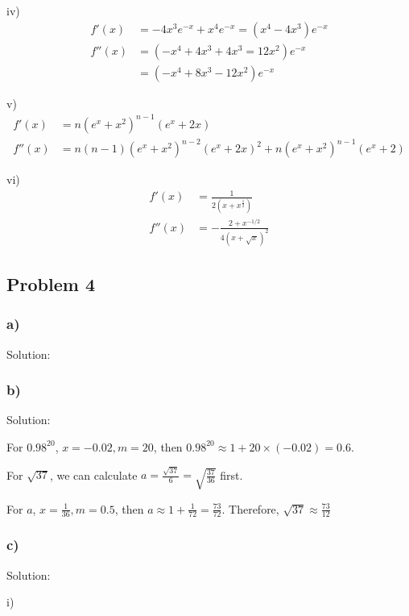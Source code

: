 \documentclass[letterpaper, 11pt]{article}
\newcommand{\1}{\mathds{1}}	%
\theoremstyle{definition}
\begin{document}
iv)
\begin{align*}
  f'(x) &= -4x ^{3} e ^{-x} + x ^{4} e ^{-x} = (x ^{4} - 4x ^{3})e ^{-x} \\
  f''(x) &=(-x ^{4} +4x ^{3} +4x ^{3} =12 x ^{2})e ^{-x} \\
      &= (-x ^{4} + 8 x ^{3}- 12 x ^{2}) e ^{-x}
\end{align*}

v)
\begin{align*}
  f'(x) &= n(e ^{x} + x ^{2}) ^{n - 1} (e ^{x} + 2x) \\
  f''(x) &= n(n-1)(e ^{x} + x ^{2}) ^{n - 2} (e ^{x} + 2x)^{2} +n(e ^{x} + x ^{2}) ^{n - 1} (e ^{x} + 2)
\end{align*}

vi)
\begin{align*}
  f'(x) &= \frac{1}{2(x + x ^{\frac{1}{2}})} \\
  f''(x) &= -\frac{2 + x ^{-1/2}}{4(x + \sqrt{x})^2}
\end{align*}

\subsection*{Problem 4}

\subsubsection*{a)}

Solution:

\subsubsection*{b)}

Solution:

For $0.98 ^{20}$, $ x = -0.02, m = 20$, then $0.98 ^{20} \approx 1 + 20 \times (-0.02) = 0.6 $.

For $\sqrt{37}$, we can calculate $a = \frac{\sqrt{37}}{6} = \sqrt{\frac{37}{36}}$ first.

For $a$, $x = \frac{1}{36}, m = 0.5$, then $a \approx 1 + \frac{1}{72} = \frac{73}{72}$. Therefore, $\sqrt{37} \approx \frac{73}{12}$

\subsubsection*{c)}

Solution: %

i)
\end{document}
